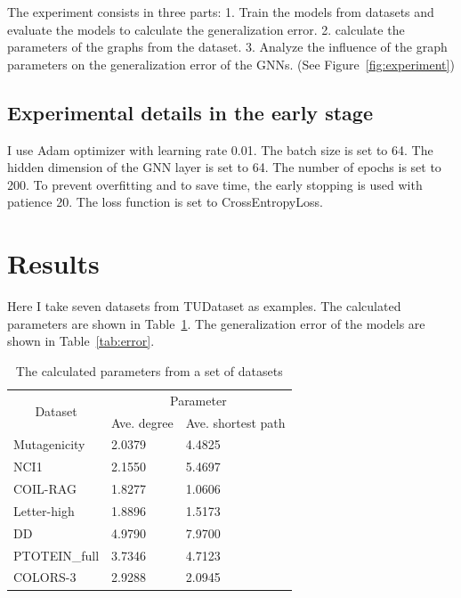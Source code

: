 \documentclass{article}
\begin{document}
The experiment consists in three parts: 1. Train the models from datasets and evaluate the models to calculate the generalization error. 2. calculate the parameters of the graphs from the dataset. 3. Analyze the influence of the graph parameters on the generalization error of the GNNs. (See Figure~\ref{fig:experiment})


\subsection{Experimental details in the early stage}
I use Adam optimizer with learning rate 0.01. The batch size is set to 64. The hidden dimension of the GNN layer is set to 64. The number of epochs is set to 200. To prevent overfitting and to save time, the early stopping is used with patience 20. The loss function is set to CrossEntropyLoss. 

\section{Results}

Here I take seven datasets from TUDataset as examples. The calculated parameters are shown in Table~\ref{tab:parameter}. The generalization error of the models are shown in Table~\ref{tab:error}. 

\begin{table}[h!]
    \centering
    \begin{tabular}{@{}lll@{}}
    \toprule
    \multicolumn{1}{c}{\multirow{2}{*}{Dataset}} & \multicolumn{2}{c}{Parameter}                                            \\ \cmidrule(l){2-3} 
    \multicolumn{1}{c}{}                         & \multicolumn{1}{c}{Ave. degree} & \multicolumn{1}{c}{Ave. shortest path} \\ \midrule
    Mutagenicity                                 & 2.0379         & 4.4825                     \\
    NCI1                                         & 2.1550         & 5.4697                     \\
    COIL-RAG                                     & 1.8277         & 1.0606                     \\
    Letter-high                                  & 1.8896         & 1.5173                     \\
    DD                                           & 4.9790         & 7.9700                     \\
    PTOTEIN\_full                                & 3.7346         & 4.7123                     \\
    COLORS-3                                     & 2.9288         & 2.0945                     \\ \bottomrule
    \end{tabular}
    \caption{The calculated parameters from a set of datasets}
    \label{tab:parameter}
\end{table}
\end{document}
